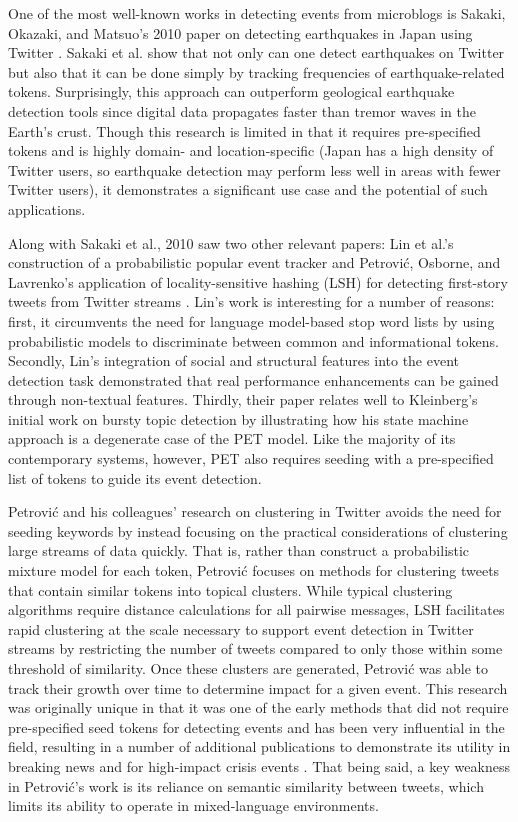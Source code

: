\documentclass{sig-alternate}
\begin{document}
One of the most well-known works in detecting events from microblogs is Sakaki, Okazaki, and Matsuo's 2010 paper on detecting earthquakes in Japan using Twitter \cite{Sakaki:2010:EST:1772690.1772777}.
Sakaki et al. show that not only can one detect earthquakes on Twitter but also that it can be done simply by tracking frequencies of earthquake-related tokens.
Surprisingly, this approach can outperform geological earthquake detection tools since digital data propagates faster than tremor waves in the Earth's crust.
Though this research is limited in that it requires pre-specified tokens and is highly domain- and location-specific (Japan has a high density of Twitter users, so earthquake detection may perform less well in areas with fewer Twitter users), it demonstrates a significant use case and the potential of such applications.

Along with Sakaki et al., 2010 saw two other relevant papers: Lin et al.'s construction of a probabilistic popular event tracker \cite{Lin:2010:PSM:1835804.1835922} and Petrovi\'{c}, Osborne, and Lavrenko's application of locality-sensitive hashing (LSH) for detecting first-story tweets from Twitter streams \cite{Petrovic:2010:SFS:1857999.1858020}.
Lin's work is interesting for a number of reasons: first, it circumvents the need for language model-based stop word lists by using probabilistic models to discriminate between common and informational tokens.
Secondly, Lin's integration of social and structural features into the event detection task demonstrated that real performance enhancements can be gained through non-textual features.
Thirdly, their paper relates well to Kleinberg's initial work on bursty topic detection by illustrating how his state machine approach is a degenerate case of the PET model.
Like the majority of its contemporary systems, however, PET also requires seeding with a pre-specified list of tokens to guide its event detection.

Petrovi\'{c} and his colleagues' research on clustering in Twitter avoids the need for seeding keywords by instead focusing on the practical considerations of clustering large streams of data quickly.
That is, rather than construct a probabilistic mixture model for each token, Petrovi\'{c} focuses on methods for clustering tweets that contain similar tokens into topical clusters.
While typical clustering algorithms require distance calculations for all pairwise messages, LSH facilitates rapid clustering at the scale necessary to support event detection in Twitter streams by restricting the number of tweets compared to only those within some threshold of similarity.
Once these clusters are generated, Petrovi\'{c} was able to track their growth over time to determine impact for a given event.
This research was originally unique in that it was one of the early methods that did not require pre-specified seed tokens for detecting events and has been very influential in the field, resulting in a number of additional publications to demonstrate its utility in breaking news and for high-impact crisis events \cite{osborne2014real,petrovic2013can,6601695}.
That being said, a key weakness in Petrovi\'{c}'s work is its reliance on semantic similarity between tweets, which limits its ability to operate in mixed-language environments.
\end{document}
